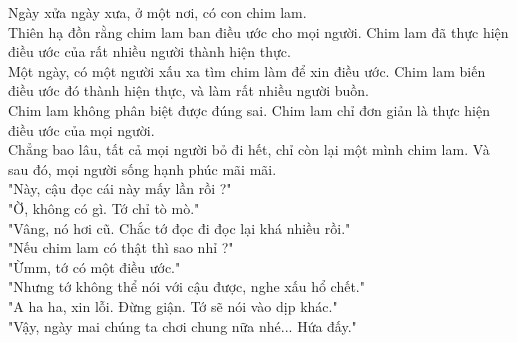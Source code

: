 
Ngày xửa ngày xưa, ở một nơi, có con chim lam. \\

Thiên hạ đồn rằng chim lam ban điều ước cho mọi người. Chim lam đã thực hiện điều ước của rất nhiều người thành hiện thực. \\

Một ngày, có một người xấu xa tìm chim làm để xin điều ước. Chim lam biến điều ước đó thành hiện thực, và làm rất nhiều người buồn. \\

Chim lam không phân biệt được đúng sai. Chim lam chỉ đơn giản là thực hiện điều ước của mọi người. \\

Chẳng bao lâu, tất cả mọi người bỏ đi hết, chỉ còn lại một mình chim lam. Và sau đó, mọi người sống hạnh phúc mãi mãi. \\

"Này, cậu đọc cái này mấy lần rồi ?"\\

"Ờ, không có gì. Tớ chỉ tò mò."\\

"Vâng, nó hơi cũ. Chắc tớ đọc đi đọc lại khá nhiều rồi."\\

"Nếu chim lam có thật thì sao nhỉ ?"\\

"Ừmm, tớ có một điều ước."\\

"Nhưng tớ không thể nói với cậu được, nghe xấu hổ chết."\\

"A ha ha, xin lỗi. Đừng giận. Tớ sẽ nói vào dịp khác."\\

"Vậy, ngày mai chúng ta chơi chung nữa nhé... Hứa đấy."\\




